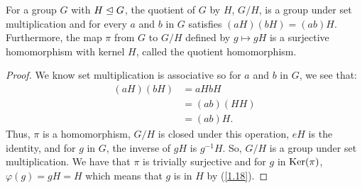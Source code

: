 For a group $G$ with $H \trianglelefteq G$, the quotient of $G$ by $H$, 
$G / H$, is a group under
set multiplication and for every $a$ and $b$ in $G$ satisfies
$(aH)(bH) = (ab)H$. Furthermore, the map $\pi$ from $G$ to $G / H$
defined by $g \mapsto gH$ is a surjective homomorphism with
kernel $H$, called the quotient homomorphism.

\begin{proof}
    We know set multiplication is associative so for 
    $a$ and $b$ in $G$, we see that: \begin{align*}
        (aH)(bH) &= aHbH \\
        &= (ab)(HH) \tag{$H \nsub G$} \\
        &= (ab)H.
    \end{align*} Thus, $\pi$ is a homomorphism, $G / H$ is closed under this operation,
    $eH$ is the identity, and for $g$ in $G$, the inverse of $gH$ is $g^{-1}H$. 
    So, $G/H$ is a group under set multiplication.
    We have that $\pi$ is trivially surjective and for $g$ in $\operatorname{Ker}(\pi)$,
    $\varphi(g) = gH = H$ which means that $g$ is in $H$ by (\ref{1.18}).
\end{proof} 
